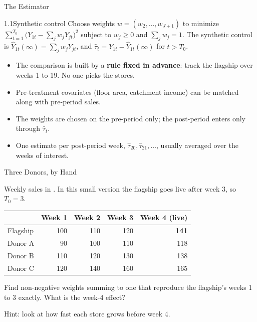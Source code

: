 \documentclass[aspectratio=169, 11pt, handout]{beamer}
\newcommand{\hatt}{\hat{\tau}}
\newenvironment{definition*}[2]{%
  \setbeamercolor{block title}{bg=extgrey,fg=white}\setbeamercolor{block body}{bg=boxgrey,fg=black}%
  \begin{block}{Definition #1 (#2)}}{\end{block}}
\begin{document}
\begin{frame}{The Estimator}

\begin{definition*}{1.1}{Synthetic control}
Choose weights $w = (w_2, \dots, w_{J+1})$ to minimize $\sum_{t=1}^{T_0}\big(Y_{1t} - \sum_j w_jY_{jt}\big)^2$ subject to $w_j \ge 0$ and
$\sum_j w_j = 1$. The synthetic control is $\hat Y_{1t}(\infty) = \sum_j w_jY_{jt}$, and $\hatt_t = Y_{1t} - \hat Y_{1t}(\infty)$ for $t > T_0$.
\end{definition*}

\medskip

\begin{itemize}
  \item The comparison is built by a \textbf{rule fixed in advance}: track the flagship over weeks 1 to 19. No one picks the stores.
  \item Pre-treatment covariates (floor area, catchment income) can be matched along with pre-period sales.
  \item The weights are chosen on the pre-period only; the post-period enters only through $\hatt_t$.
  \item One estimate per post-period week, $\hatt_{20}, \hatt_{21}, \dots$, usually averaged over the weeks of interest.
\end{itemize}
\end{frame}

\begin{frame}{Three Donors, by Hand}

Weekly sales in . In this small version the flagship goes live after week 3, so $T_0 = 3$.

\begin{center}
\begin{tabular}{lrrrr}
\toprule
& \textbf{Week 1} & \textbf{Week 2} & \textbf{Week 3} & \textbf{Week 4 (live)} \\
\midrule
Flagship & 100 & 110 & 120 & \textbf{141} \\
Donor A  &  90 & 100 & 110 & 118 \\
Donor B  & 110 & 120 & 130 & 138 \\
Donor C  & 120 & 140 & 160 & 165 \\
\bottomrule
\end{tabular}
\end{center}

\bigskip

Find non-negative weights summing to one that reproduce the flagship's weeks 1 to 3 exactly. What is the week-4 effect?

\medskip

\small Hint: look at how fast each store grows before week 4.
\end{frame}
\end{document}
